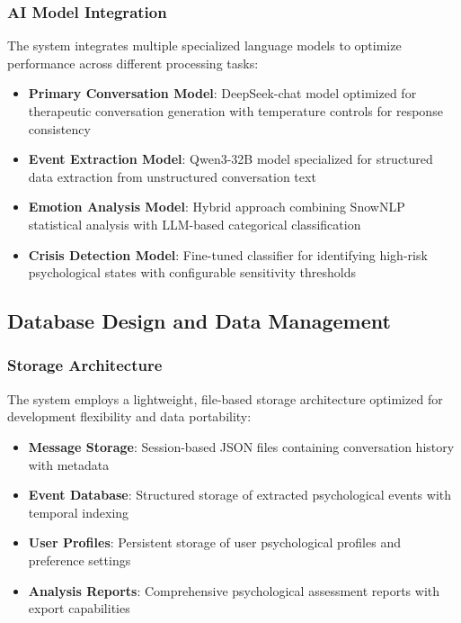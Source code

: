 \subsubsection{AI Model Integration}

The system integrates multiple specialized language models to optimize performance across different processing tasks:

\begin{itemize}
\item \textbf{Primary Conversation Model}: DeepSeek-chat model optimized for therapeutic conversation generation with temperature controls for response consistency
\item \textbf{Event Extraction Model}: Qwen3-32B model specialized for structured data extraction from unstructured conversation text
\item \textbf{Emotion Analysis Model}: Hybrid approach combining SnowNLP statistical analysis with LLM-based categorical classification
\item \textbf{Crisis Detection Model}: Fine-tuned classifier for identifying high-risk psychological states with configurable sensitivity thresholds
\end{itemize}

\subsection{Database Design and Data Management}

\subsubsection{Storage Architecture}

The system employs a lightweight, file-based storage architecture optimized for development flexibility and data portability:

\begin{itemize}
\item \textbf{Message Storage}: Session-based JSON files containing conversation history with metadata
\item \textbf{Event Database}: Structured storage of extracted psychological events with temporal indexing
\item \textbf{User Profiles}: Persistent storage of user psychological profiles and preference settings
\item \textbf{Analysis Reports}: Comprehensive psychological assessment reports with export capabilities
\end{itemize}

